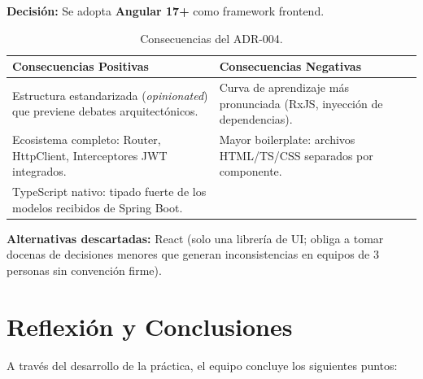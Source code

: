 \documentclass[12pt]{article}
\begin{document}
	\textbf{Decisión:} Se adopta \textbf{Angular 17+} como framework frontend.
	
	\begin{table}[H]
		\centering
		\begin{tabular}{@{}p{7cm}p{7cm}@{}}
			\toprule
			\textbf{Consecuencias Positivas} & \textbf{Consecuencias Negativas} \\ \midrule
			Estructura estandarizada (\textit{opinionated}) que previene debates arquitectónicos. & Curva de aprendizaje más pronunciada (RxJS, inyección de dependencias). \\[4pt]
			Ecosistema completo: Router, HttpClient, Interceptores JWT integrados. & Mayor boilerplate: archivos HTML/TS/CSS separados por componente. \\[4pt]
			TypeScript nativo: tipado fuerte de los modelos recibidos de Spring Boot. & \\
			\bottomrule
		\end{tabular}
		\caption{Consecuencias del ADR-004.}
	\end{table}
	
	\textbf{Alternativas descartadas:} React (solo una librería de UI; obliga a tomar docenas de decisiones menores que generan inconsistencias en equipos de 3 personas sin convención firme).
	
	\newpage
	
	\section{Reflexión y Conclusiones}
	
	A través del desarrollo de la práctica, el equipo concluye los siguientes puntos:
	
\end{document}
